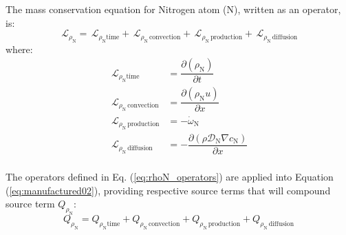 \documentclass[10pt]{article}
\newcommand{\Diff}[2] {\dfrac{\partial( #1)}{\partial #2}}
\newcommand{\diff}[2] {\dfrac{\partial #1 }{\partial #2}}
\newcommand{\Lo}{\,\mathcal{L}}
\newcommand{\N}{\text{N}}
\newcommand{\convection}{\,\text{convection}}
\newcommand{\production}{\,\text{production}}
\newcommand{\diffusion}{\,\text{diffusion}}
\begin{document}
The mass conservation equation for Nitrogen atom (N), written as an operator, is:
\begin{equation*}
 \label{eq:ns1d_11}
\Lo_{\rho_{\N} } = \Lo_{\rho_{\N} \text{time}}+\Lo_{\rho_{\N} \convection}+\Lo_{\rho_{\N} \production}+\Lo_{\rho_{\N} \diffusion} 
\end{equation*}
where:
\begin{equation}
\begin{split}\label{eq:rhoN_operators}
\Lo_{\rho_{\N} \text{time}}&= \Diff{\rho_{\N}}{t}\\
\Lo_{\rho_{\N} \convection}&= \Diff{\rho_{\N} u}{x}\\
\Lo_{\rho_{\N} \production}&= - \dot{\omega}_{\text{N}}\\
\Lo_{\rho_{\N} \diffusion} &= -\diff{ \left(\rho \mathcal{D}_{\N} \nabla c_{\N} \right)}{x}\\
\end{split}
\end{equation}

The operators defined in Eq. (\ref{eq:rhoN_operators}) are applied into Equation  (\ref{eq:manufactured02}), providing respective
source terms that will compound source term $Q_{\rho_{\N} }$:
\begin{equation*}
Q_{\rho_{\N} } = Q_{\rho_{\N} \text{time}}+Q_{\rho_{\N} \convection}+Q_{\rho_{\N} \production}+Q_{\rho_{\N} \diffusion} 	
\end{equation*}
\end{document}
